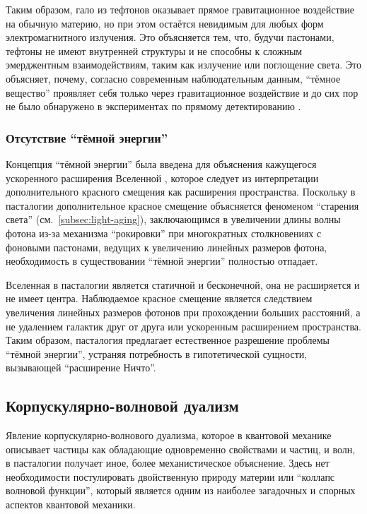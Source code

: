 \documentclass[pdflatex,sn-mathphys-num,referee]{sn-jnl}
\begin{document}
Таким образом, гало из тефтонов оказывает прямое гравитационное воздействие на обычную материю, но при этом остаётся невидимым для любых форм электромагнитного излучения. Это объясняется тем, что, будучи пастонами, тефтоны не имеют внутренней структуры и не способны к сложным эмерджентным взаимодействиям, таким как излучение или поглощение света. Это объясняет, почему, согласно современным наблюдательным данным, ``тёмное вещество'' проявляет себя только через гравитационное воздействие и до сих пор не было обнаружено в экспериментах по прямому детектированию \cite{bertone2005-review}.

\subsubsection{Отсутствие ``тёмной энергии''}\label{subsubsec:no-dark-energy}

Концепция ``тёмной энергии'' была введена для объяснения кажущегося ускоренного расширения Вселенной \cite{riess1998}, которое следует из интерпретации дополнительного красного смещения как расширения пространства. Поскольку в пасталогии дополнительное красное смещение объясняется феноменом ``старения света'' (см.~\ref{subsec:light-aging}), заключающимся в увеличении длины волны фотона из-за механизма ``рокировки'' при многократных столкновениях с фоновыми пастонами, ведущих к увеличению линейных размеров фотона, необходимость в существовании ``тёмной энергии'' полностью отпадает.

Вселенная в пасталогии является статичной и бесконечной, она не расширяется и не имеет центра. Наблюдаемое красное смещение является следствием увеличения линейных размеров фотонов при прохождении больших расстояний, а не удалением галактик друг от друга или ускоренным расширением пространства. Таким образом, пасталогия предлагает естественное разрешение проблемы ``тёмной энергии'', устраняя потребность в гипотетической сущности, вызывающей ``расширение Ничто''.

\subsection{Корпускулярно-волновой дуализм}\label{subsec:wave-particle-duality}

Явление корпускулярно-волнового дуализма, которое в квантовой механике описывает частицы как обладающие одновременно свойствами и частиц, и волн, в пасталогии получает иное, более механистическое объяснение. Здесь нет необходимости постулировать двойственную природу материи или ``коллапс волновой функции'', который является одним из наиболее загадочных и спорных аспектов квантовой механики.
\end{document}
